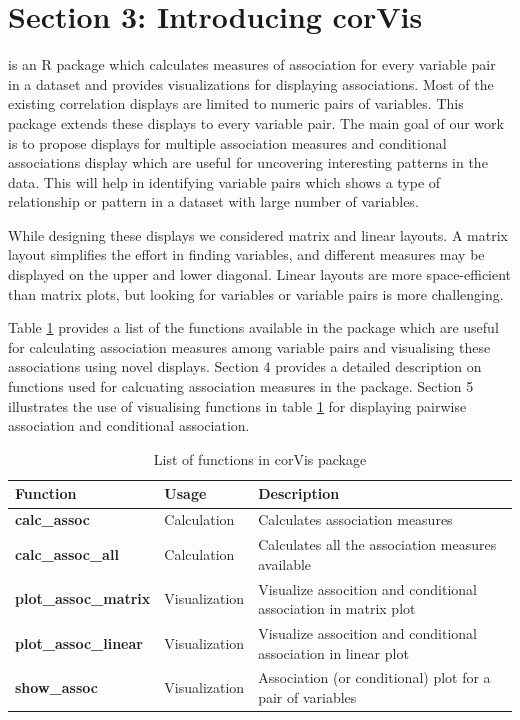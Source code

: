 \hypertarget{section-3-introducing-corvis}{%
\section{Section 3: Introducing
corVis}\label{section-3-introducing-corvis}}

 is an R package which calculates measures of
association for every variable pair in a dataset and provides
visualizations for displaying associations. Most of the existing
correlation displays are limited to numeric pairs of variables. This
package extends these displays to every variable pair. The main goal of
our work is to propose displays for multiple association measures and
conditional associations display which are useful for uncovering
interesting patterns in the data. This will help in identifying variable
pairs which shows a type of relationship or pattern in a dataset with
large number of variables.

While designing these displays we considered matrix and linear layouts.
A matrix layout simplifies the effort in finding variables, and
different measures may be displayed on the upper and lower diagonal.
Linear layouts are more space-efficient than matrix plots, but looking
for variables or variable pairs is more challenging.

Table \ref{tab:function-corVis} provides a list of the functions
available in the package which are useful for calculating association
measures among variable pairs and visualising these associations using
novel displays. Section 4 provides a detailed description on functions
used for calcuating association measures in the package. Section 5
illustrates the use of visualising functions in table
\ref{tab:function-corVis} for displaying pairwise association and
conditional association.

\begin{Schunk}
\begin{table}

\caption{\label{tab:function-corVis}List of functions in corVis package}
\centering
\begin{tabular}[t]{>{}l|l|l}
\hline
Function & Usage & Description\\
\hline
\textbf{calc\_assoc} & Calculation & Calculates association measures\\
\hline
\textbf{calc\_assoc\_all} & Calculation & Calculates all the association measures available\\
\hline
\textbf{plot\_assoc\_matrix} & Visualization & Visualize assocition and conditional association in matrix plot\\
\hline
\textbf{plot\_assoc\_linear} & Visualization & Visualize assocition and conditional association in linear plot\\
\hline
\textbf{show\_assoc} & Visualization & Association (or conditional) plot for a pair of variables\\
\hline
\end{tabular}
\end{table}

\end{Schunk}

